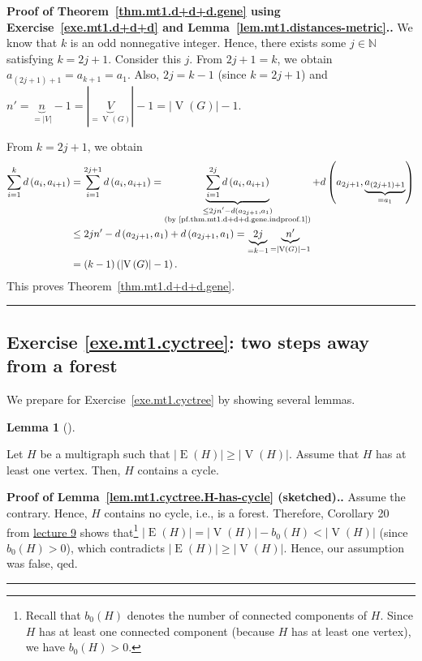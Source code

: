 \documentclass[numbers=enddot,12pt,final,onecolumn,notitlepage]{scrartcl}%
\theoremstyle{definition}
\newtheorem{lem}[theo]{Lemma}
\newenvironment{lemma}[1][]
{\begin{lem}[#1]\begin{leftbar}}
{\end{leftbar}\end{lem}}
\newenvironment{proof}[1][Proof]{\noindent\textbf{#1.} }{\ \rule{0.5em}{0.5em}}
\let\sumnonlimits\sum
\renewcommand{\sum}{\sumnonlimits\limits}
\newcommand{\NN}{\mathbb{N}}
\newcommand{\abs}[1]{\left| #1 \right|}
\newcommand{\tup}[1]{\left( #1 \right)}
\newcommand{\verts}[1]{\operatorname{V}\left( #1 \right)}
\newcommand{\edges}[1]{\operatorname{E}\left( #1 \right)}
\newcommand{\underbrack}[2]{\underbrace{#1}_{\substack{#2}}}
\begin{document}
\begin{proof}[Proof of Theorem~\ref{thm.mt1.d+d+d.gene} using
Exercise~\ref{exe.mt1.d+d+d} and
Lemma~\ref{lem.mt1.distances-metric}.]
We know that $k$ is an odd nonnegative integer.
Hence, there exists some $j \in \NN$ satisfying $k = 2j+1$.
Consider this $j$.
From $2j+1 = k$, we obtain $a_{\tup{2j+1}+1} = a_{k+1} = a_1$.
Also, $2j = k-1$ (since $k = 2j+1$) and
$n' = \underbrace{n}_{= \abs{V}} - 1
= \abs{\underbrace{V}_{= \verts{G}}} - 1
= \abs{\verts{G}} - 1$.

From $k = 2j+1$, we obtain
\begin{align*}
\sum_{i=1}^k d \tup{a_i, a_{i+1}}
&= \sum_{i=1}^{2j+1} d \tup{a_i, a_{i+1}}
 = \underbrack{\sum_{i=1}^{2j} d \tup{a_i, a_{i+1}}}
              {\leq 2j n' - d \tup{a_{2j+1}, a_1} \\
               \text{(by \eqref{pf.thm.mt1.d+d+d.gene.indproof.1})}}
         + d \tup{a_{2j+1}, \underbrace{a_{\tup{2j+1}+1}}_{= a_1}} \\
&\leq 2j n' - d \tup{a_{2j+1}, a_1} + d \tup{a_{2j+1}, a_1}
 = \underbrace{2j}_{= k-1} \underbrace{n'}_{= \abs{\verts{G}} - 1} \\
&= \tup{k-1} \tup{\abs{\verts{G}} - 1} .
\end{align*}
This proves Theorem~\ref{thm.mt1.d+d+d.gene}.
\end{proof}

\subsection{Exercise \ref{exe.mt1.cyctree}: two steps away from a
forest}

We prepare for Exercise~\ref{exe.mt1.cyctree} by showing several
lemmas.

\begin{lemma} \label{lem.mt1.cyctree.H-has-cycle}
Let $H$ be a multigraph such that
$\abs{\edges{H}} \geq \abs{\verts{H}}$.
Assume that $H$ has at least one vertex.
Then, $H$ contains a cycle.
\end{lemma}

\begin{proof}[Proof of Lemma~\ref{lem.mt1.cyctree.H-has-cycle}
(sketched).]
Assume the contrary. Hence, $H$
contains no cycle, i.e., is a forest. Therefore, Corollary 20 from
\href{http://www.cip.ifi.lmu.de/~grinberg/t/17s/5707lec9.pdf}{lecture 9}
shows that\footnote{Recall that $b_0 \tup{H}$ denotes the number of
connected components of $H$. Since $H$ has at least one connected
component (because $H$ has at least one vertex), we have
$b_0 \tup{H} > 0$.}
$\abs{\edges{H}} = \abs{\verts{H}} - b_0 \tup{H} < \abs{\verts{H}}$
(since $b_0 \tup{H} > 0$), which contradicts
$\abs{\edges{H}} \geq \abs{\verts{H}}$.
Hence, our assumption was false, qed.
\end{proof}
\end{document}
